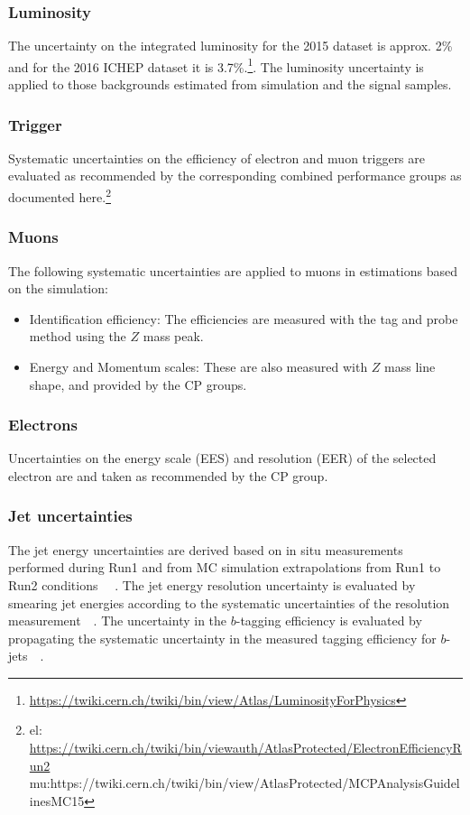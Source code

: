 \subsubsection{Luminosity}
The uncertainty on the integrated luminosity for the 2015 dataset is
approx. 2\% and for the 2016 ICHEP dataset it is 3.7\%.\footnote{\url{https://twiki.cern.ch/twiki/bin/view/Atlas/LuminosityForPhysics}}. The luminosity uncertainty is
applied to those backgrounds estimated from simulation and the signal
samples.

\subsubsection{Trigger}
Systematic uncertainties on the efficiency of electron and muon triggers are
evaluated as recommended by the corresponding combined performance groups as documented here.\footnote{el: \url{https://twiki.cern.ch/twiki/bin/viewauth/AtlasProtected/ElectronEfficiencyRun2} \\ mu:{https://twiki.cern.ch/twiki/bin/view/AtlasProtected/MCPAnalysisGuidelinesMC15}} 

\subsubsection{Muons}
The following systematic uncertainties are applied to muons in estimations based on the simulation:

\begin{itemize}
\item Identification efficiency: The efficiencies are measured with the tag and probe method using the $Z$ mass peak.
\item Energy and Momentum scales: These are also measured with $Z$ mass line shape, and provided by the CP groups. 
\end{itemize}

\subsubsection{Electrons}
Uncertainties  on  the  energy  scale  (EES)  and  resolution  (EER)  of  the  selected  electron  are and taken as recommended by the CP group.  


\subsubsection{Jet uncertainties}
The jet energy uncertainties are derived based on in situ measurements performed during Run1 and from MC simulation extrapolations from Run1 to Run2 conditions ~~\cite{ATL-PHYS-PUB-2015-015}. The jet energy resolution uncertainty is evaluated by smearing jet energies according to the systematic uncertainties of the resolution measurement~~\cite{Aad:2014bia}. The uncertainty in the $b$-tagging efficiency is evaluated by propagating the systematic uncertainty in the measured tagging efficiency for $b$-jets~~\cite{ATLAS-CONF-2014-004}. 


